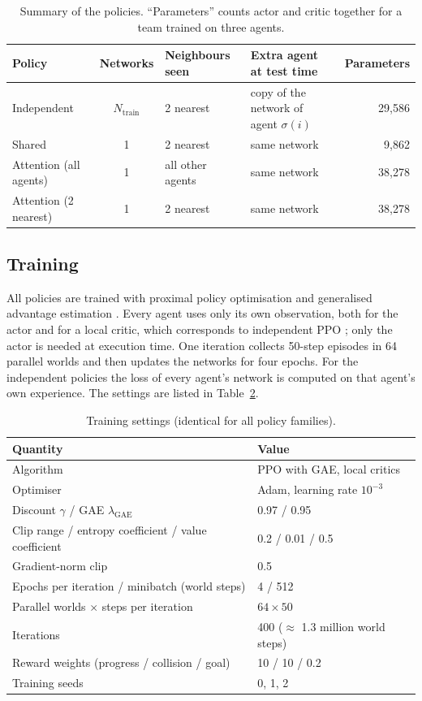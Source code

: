 \begin{table}[t]
  \centering\small
  \caption{Summary of the policies. ``Parameters'' counts actor and critic together for a team trained on three agents.}
  \label{tab:pt-arch}
  \begin{tabular}{l c l p{4.1cm} r}
    \toprule
    Policy & Networks & Neighbours seen & Extra agent at test time & Parameters \\
    \midrule
    Independent            & $N_{\text{train}}$ & 2 nearest & copy of the network of agent $\sigma(i)$ & 29,586 \\
    Shared                 & 1 & 2 nearest & same network & 9,862 \\
    Attention (all agents) & 1 & all other agents & same network & 38,278 \\
    Attention (2 nearest)  & 1 & 2 nearest & same network & 38,278 \\
    \bottomrule
  \end{tabular}
\end{table}

\subsection{Training}
\label{sec:pt-training}
All policies are trained with proximal policy optimisation \citep{schulman2017} and generalised advantage
estimation \citep{schulman2016}. Every agent uses only its own observation, both for the actor and for a local
critic, which corresponds to independent PPO \citep{dewitt2020}; only the actor is needed at execution time. One
iteration collects 50-step episodes in 64 parallel worlds and then updates the networks for four epochs. For the
independent policies the loss of every agent's network is computed on that agent's own experience. The settings are
listed in Table~\ref{tab:pt-hyper}.

\begin{table}[t]
  \centering\small
  \caption{Training settings (identical for all policy families).}
  \label{tab:pt-hyper}
  \begin{tabular}{ll}
    \toprule
    Quantity & Value \\
    \midrule
    Algorithm & PPO with GAE, local critics \\
    Optimiser & Adam, learning rate $10^{-3}$ \\
    Discount $\gamma$ / GAE $\lambda_{\text{GAE}}$ & 0.97 / 0.95 \\
    Clip range / entropy coefficient / value coefficient & 0.2 / 0.01 / 0.5 \\
    Gradient-norm clip & 0.5 \\
    Epochs per iteration / minibatch (world steps) & 4 / 512 \\
    Parallel worlds $\times$ steps per iteration & $64\times 50$ \\
    Iterations & 400 ($\approx$ 1.3 million world steps) \\
    Reward weights (progress / collision / goal) & 10 / 10 / 0.2 \\
    Training seeds & 0, 1, 2 \\
    \bottomrule
  \end{tabular}
\end{table}

